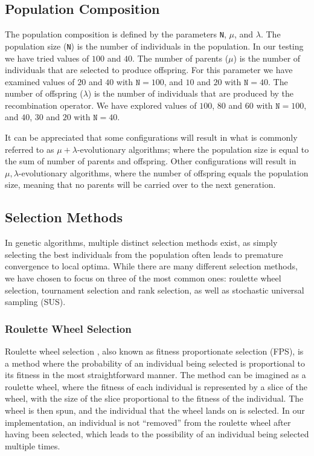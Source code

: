 \documentclass{article}
\begin{document}
\subsection{Population Composition}
\label{subsec:ga_pop}

The population composition is defined by the parameters \texttt{N}, $\mu$, and $\lambda$.
The population size (\texttt{N}) is the number of individuals in the population.
In our testing we have tried values of $100$ and $40$.
The number of parents ($\mu$) is the number of individuals that are selected to produce offspring.
For this parameter we have examined values of $20$ and $40$ with $\texttt{N}=100$, and $10$ and $20$ with $\texttt{N}=40$.
The number of offspring ($\lambda$) is the number of individuals that are produced by the recombination operator.
We have explored values of $100$, $80$ and $60$ with $\texttt{N}=100$, and $40$, $30$ and $20$ with $\texttt{N}=40$.

It can be appreciated that some configurations will result in what is commonly referred to as $\mu + \lambda$-evolutionary algorithms; where the population size is equal to the sum of number of parents and offspring.
Other configurations will result in $\mu, \lambda$-evolutionary algorithms, where the number of offspring equals the population size, meaning that no parents will be carried over to the next generation.


\subsection{Selection Methods}
\label{subsec:ga_sel}

In genetic algorithms, multiple distinct selection methods exist, as simply selecting the best individuals from the population often leads to premature convergence to local optima.
While there are many different selection methods, we have chosen to focus on three of the most common ones: roulette wheel selection, tournament selection and rank selection, as well as stochastic universal sampling (SUS).

\subsubsection*{Roulette Wheel Selection}
\label{subsubsec:ga_sel_rws}
Roulette wheel selection \cite{roulettewheel}, also known as fitness proportionate selection (FPS), is a method where the probability of an individual being selected is proportional to its fitness in the most straightforward manner.
The method can be imagined as a roulette wheel, where the fitness of each individual is represented by a slice of the wheel, with the size of the slice proportional to the fitness of the individual.
The wheel is then spun, and the individual that the wheel lands on is selected.
In our implementation, an individual is not ``removed'' from the roulette wheel after having been selected, which leads to the possibility of an individual being selected multiple times.
\end{document}
